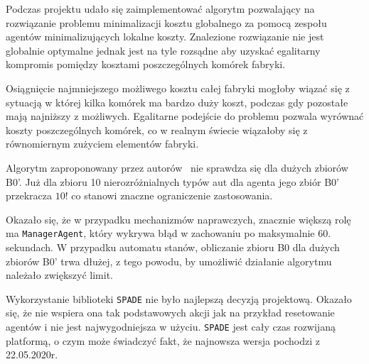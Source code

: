 Podczas projektu udało się zaimplementować algorytm pozwalający na rozwiązanie problemu minimalizacji kosztu globalnego za pomocą zespołu agentów minimalizujących lokalne koszty. Znalezione rozwiązanie nie jest globalnie optymalne jednak jest na tyle rozsądne aby uzyskać egalitarny kompromis pomiędzy kosztami poszczególnych komórek fabryki.

Osiągnięcie najmniejszego możliwego kosztu całej fabryki mogłoby wiązać się z sytuacją w której kilka komórek ma bardzo duży koszt, podczas gdy pozostałe mają najniższy z możliwych. Egalitarne podejście do problemu pozwala wyrównać koszty poszczególnych komórek, co w realnym świecie wiązałoby się z równomiernym zużyciem elementów fabryki.

Algorytm zaproponowany przez autorów~\cite{wooldridge1996production} nie sprawdza się dla dużych zbiorów B0'. Już dla zbioru 10 nierozróżnialnych typów aut dla agenta jego zbiór B0' przekracza $10!$ co stanowi znaczne ograniczenie zastosowania. 

Okazało się, że w przypadku mechanizmów naprawczych, znacznie większą rolę ma \texttt{ManagerAgent}, który wykrywa błąd w zachowaniu po maksymalnie 60. sekundach. W przypadku automatu stanów, obliczanie zbioru B0 dla dużych zbiorów B0' trwa dłużej, z tego powodu, by umożliwić działanie algorytmu należało zwiększyć limit.

Wykorzystanie biblioteki \texttt{SPADE} nie było najlepszą decyzją projektową. Okazało się, że nie wspiera ona tak podstawowych akcji jak na przykład resetowanie agentów i nie jest najwygodniejsza w użyciu. \texttt{SPADE} jest cały czas rozwijaną platformą, o czym może świadczyć fakt, że najnowsza wersja pochodzi z 22.05.2020r.
